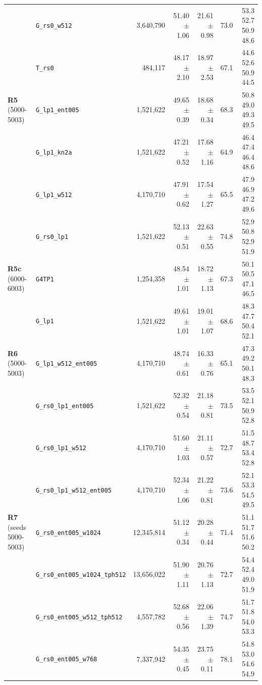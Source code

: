 \begin{longtable}{@{}llrrrrr@{}}
 & \texttt{\scriptsize G\_rs0\_w512} & 3,640,790 & 51.40 $\pm$ 1.06 & 21.61 $\pm$ 0.98 & 73.0 & {\scriptsize 53.3 52.7 50.9 48.6}\\
 & \texttt{\scriptsize T\_rs0} & 484,117 & 48.17 $\pm$ 2.10 & 18.97 $\pm$ 2.53 & 67.1 & {\scriptsize 44.6 52.6 50.9 44.5}\\
\midrule
\textbf{R5}\,{\scriptsize(5000-5003)} & \texttt{\scriptsize G\_lp1\_ent005} & 1,521,622 & 49.65 $\pm$ 0.39 & 18.68 $\pm$ 0.34 & 68.3 & {\scriptsize 50.8 49.0 49.3 49.5}\\
 & \texttt{\scriptsize G\_lp1\_kn2a} & 1,521,622 & 47.21 $\pm$ 0.52 & 17.68 $\pm$ 1.16 & 64.9 & {\scriptsize 46.4 47.4 46.4 48.6}\\
 & \texttt{\scriptsize G\_lp1\_w512} & 4,170,710 & 47.91 $\pm$ 0.62 & 17.54 $\pm$ 1.27 & 65.5 & {\scriptsize 47.9 46.9 47.2 49.6}\\
 & \texttt{\scriptsize G\_rs0\_lp1} & 1,521,622 & 52.13 $\pm$ 0.51 & 22.63 $\pm$ 0.55 & 74.8 & {\scriptsize 52.9 50.8 52.9 51.9}\\
\midrule
\textbf{R5c}\,{\scriptsize(6000-6003)} & \texttt{\scriptsize G4TP1} & 1,254,358 & 48.54 $\pm$ 1.01 & 18.72 $\pm$ 1.13 & 67.3 & {\scriptsize 50.1 50.5 47.1 46.5}\\
 & \texttt{\scriptsize G\_lp1} & 1,521,622 & 49.61 $\pm$ 1.01 & 19.01 $\pm$ 1.07 & 68.6 & {\scriptsize 48.3 47.7 50.4 52.1}\\
\midrule
\textbf{R6}\,{\scriptsize(5000-5003)} & \texttt{\scriptsize G\_lp1\_w512\_ent005} & 4,170,710 & 48.74 $\pm$ 0.61 & 16.33 $\pm$ 0.76 & 65.1 & {\scriptsize 47.3 49.2 50.1 48.3}\\
 & \texttt{\scriptsize G\_rs0\_lp1\_ent005} & 1,521,622 & 52.32 $\pm$ 0.54 & 21.18 $\pm$ 0.81 & 73.5 & {\scriptsize 53.5 52.1 50.9 52.8}\\
 & \texttt{\scriptsize G\_rs0\_lp1\_w512} & 4,170,710 & 51.60 $\pm$ 1.03 & 21.11 $\pm$ 0.57 & 72.7 & {\scriptsize 51.5 48.7 53.4 52.8}\\
 & \texttt{\scriptsize G\_rs0\_lp1\_w512\_ent005} & 4,170,710 & 52.34 $\pm$ 1.06 & 21.22 $\pm$ 0.81 & 73.6 & {\scriptsize 52.1 53.3 54.5 49.5}\\
\midrule
\textbf{R7}\,{\scriptsize(seeds 5000-5003)} & \texttt{\scriptsize G\_rs0\_ent005\_w1024} & 12,345,814 & 51.12 $\pm$ 0.34 & 20.28 $\pm$ 0.44 & 71.4 & {\scriptsize 51.1 51.7 51.6 50.2}\\
 & \texttt{\scriptsize G\_rs0\_ent005\_w1024\_tph512} & 13,656,022 & 51.90 $\pm$ 1.11 & 20.76 $\pm$ 1.13 & 72.7 & {\scriptsize 54.4 52.4 49.0 51.9}\\
 & \texttt{\scriptsize G\_rs0\_ent005\_w512\_tph512} & 4,557,782 & 52.68 $\pm$ 0.56 & 22.06 $\pm$ 1.39 & 74.7 & {\scriptsize 51.7 51.8 54.0 53.3}\\
 & \texttt{\scriptsize G\_rs0\_ent005\_w768} & 7,337,942 & 54.35 $\pm$ 0.45 & 23.75 $\pm$ 0.11 & 78.1 & {\scriptsize 54.8 53.0 54.6 54.9}\\
\bottomrule
\end{longtable}
